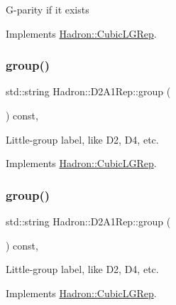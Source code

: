 G-\/parity if it exists 

Implements \mbox{\hyperlink{structHadron_1_1CubicLGRep_ace26f7b2d55e3a668a14cb9026da5231}{Hadron\+::\+Cubic\+L\+G\+Rep}}.

\mbox{\label{structHadron_1_1D2A1Rep_a6762c80fbf9ea0761e63a9ad4711ed39}} 
\subsubsection{\texorpdfstring{group()}{group()}\hspace{0.1cm}{\footnotesize\ttfamily [1/3]}}
{\footnotesize\ttfamily std\+::string Hadron\+::\+D2\+A1\+Rep\+::group (\begin{DoxyParamCaption}{ }\end{DoxyParamCaption}) const\hspace{0.3cm}{\ttfamily [inline]}, {\ttfamily [virtual]}}

Little-\/group label, like D2, D4, etc. 

Implements \mbox{\hyperlink{structHadron_1_1CubicLGRep_a9bdb14b519a611d21379ed96a3a9eb41}{Hadron\+::\+Cubic\+L\+G\+Rep}}.

\mbox{\label{structHadron_1_1D2A1Rep_a6762c80fbf9ea0761e63a9ad4711ed39}} 
\subsubsection{\texorpdfstring{group()}{group()}\hspace{0.1cm}{\footnotesize\ttfamily [2/3]}}
{\footnotesize\ttfamily std\+::string Hadron\+::\+D2\+A1\+Rep\+::group (\begin{DoxyParamCaption}{ }\end{DoxyParamCaption}) const\hspace{0.3cm}{\ttfamily [inline]}, {\ttfamily [virtual]}}

Little-\/group label, like D2, D4, etc. 

Implements \mbox{\hyperlink{structHadron_1_1CubicLGRep_a9bdb14b519a611d21379ed96a3a9eb41}{Hadron\+::\+Cubic\+L\+G\+Rep}}.

\mbox{\label{structHadron_1_1D2A1Rep_a6762c80fbf9ea0761e63a9ad4711ed39}} 
